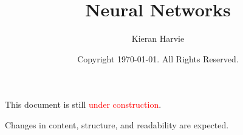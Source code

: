 \documentclass[12pt]{report}
\title{Neural Networks}
\date{Copyright \textcopyright  \today. All Rights Reserved.}
\author{Kieran Harvie}
\begin{document}
\maketitle
This document is still \textcolor{red}{under construction}.

Changes in content, structure, and readability are expected.
\tableofcontents





\renewcommand{\thechapter}{A}

\end{document}

